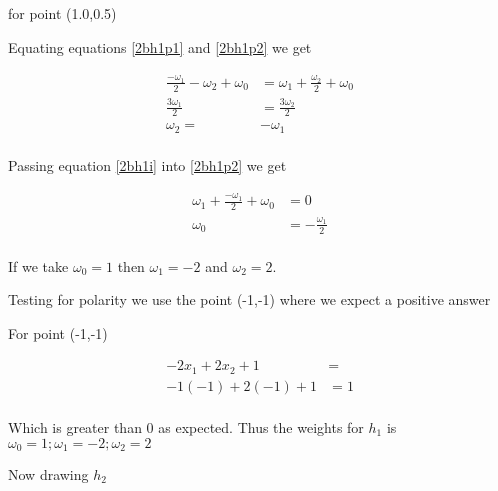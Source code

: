 \documentclass[10pt,a4paper]{article}
\begin{document}
for point (1.0,0.5)

Equating equations \ref{2bh1p1} and \ref{2bh1p2} we get

\begin{equation}
\label{2bh1i}
\begin{split}
\frac{-\omega_1}{2} - \omega_2 + \omega_0 &= \omega_1 + \frac{\omega_2}{2} + \omega_0\\
\frac{3\omega_1}{2} &= \frac{3\omega_2}{2}\\
\omega_2 =& - \omega_1\\
\end{split}
\end{equation}

Passing equation \ref{2bh1i} into \ref{2bh1p2} we get

\begin{equation}
\begin{split}
\omega_1 + \frac{-\omega_1}{2} + \omega_0 &= 0 \\
\omega_0 &= -\frac{\omega_1}{2}\\
\end{split}
\end{equation}

If we take $\omega_0 = 1$ then $\omega_1 = -2$ and $\omega_2 = 2$.

Testing for polarity we use the point (-1,-1) where we expect a positive answer 

For point (-1,-1)

\begin{equation}
\begin{split}
-2x_1+2x_2 + 1 &=\\
-1(-1) + 2(-1) + 1& = 1\\
\end{split}
\end{equation}

Which is greater than 0 as expected. Thus the weights for $h_1$ is $\omega_0 = 1; \omega_1 = -2; \omega_2 = 2$ 

Now drawing $h_2$

\begin{center}
\end{center}
\end{document}
